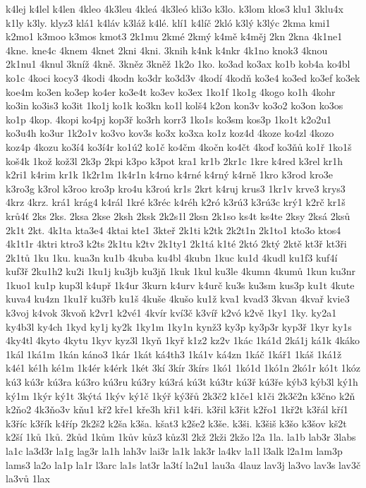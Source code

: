 k4lej
k4lel
k4len
4kleo
4k3leu
4kleá
4k3leó
kli3o
k3lo.
k3lom
klos3
klu1
3klu4x
k1ly
k3ly.
klyz3
klá1
k4láv
k3láž
k4lé.
klí1
k4líč
2kló
k3lý
k3lýc
2kma
kmi1
k2mo1
k3moo
k3mos
kmot3
2k1mu
2kmé
2kmý
k4mě
k4měj
2kn
2kna
4k1ne1
4kne.
kne4c
4knem
4knet
2kni
4kni.
3knih
k4nk
k4nkr
4k1no
knok3
4knou
2k1nu1
4knul
3kníž
4kně.
3kněz
3kněž
1k2o
1ko.
ko3ad
ko3ax
ko1b
kob4a
ko4bl
ko1c
4koci
kocy3
4kodi
4kodn
ko3dr
ko3d3v
4kodí
4kodň
ko3e4
ko3ed
ko3ef
ko3ek
koe4m
ko3en
ko3ep
ko4er
ko3e4t
ko3ev
ko3ex
1ko1f
1ko1g
4kogo
ko1h
4kohr
ko3in
ko3is3
ko3it
1ko1j
ko1k
ko3kn
ko1l
kolš4
k2on
kon3v
ko3o2
ko3on
ko3os
ko1p
4kop.
4kopi
ko4pj
kop3ř
ko3rh
korr3
1ko1s
ko3sm
kos3p
1ko1t
k2o2u1
ko3u4h
ko3ur
1k2o1v
ko3vo
kov3s
ko3x
ko3xa
ko1z
koz4d
4koze
ko4zl
4kozo
koz4p
4kozu
ko3í4
ko3í4r
ko1ú2
ko1č
ko4čm
4kočn
ko4čt
4koď
ko3ňů
ko1ř
1ko1š
koš4k
1kož
kož3l
2k3p
2kpi
k3po
k3pot
kra1
kr1b
2kr1c
1kre
k4red
k3rel
kr1h
k2ri1
k4rim
kr1k
1k2r1m
1k4r1n
k4rno
k4rné
k4rný
k4rně
1kro
k3rod
kro3e
k3ro3g
k3rol
k3roo
kro3p
kro4u
k3roú
kr1s
2krt
k4ruj
krus3
1kr1v
krve3
krys3
4krz
4krz.
krá1
krág4
k4rál
1kré
k3réc
k4réh
k2ró
k3rú3
k3rú3c
krý1
k2rč
kr1š
krů4ť
2ks
2ks.
2ksa
2kse
2ksh
2ksk
2k2s1l
2ksn
2k1so
ks4t
ks4te
2ksy
2ksá
2ksů
2k1t
2kt.
4k1ta
kta3e4
4ktai
kte1
3kteř
2k1ti
k2tk
2k2t1n
2k1to1
kto3o
ktos4
4k1t1r
4ktri
ktro3
k2ts
2k1tu
k2tv
2k1ty1
2k1tá
k1té
2któ
2ktý
2ktě
kt3ř
kt3ři
2k1tů
1ku
1ku.
kua3n
ku1b
4kuba
ku4bl
4kubn
1kuc
ku1d
4kudl
ku1f3
kuf4í
kuf3ř
2ku1h2
ku2i
1ku1j
ku3jb
ku3jň
1kuk
1kul
ku3le
4kumn
4kumů
1kun
ku3nr
1kuo1
ku1p
kup3l
k4upř
1k4ur
3kurn
k4urv
k4urč
ku3s
ku3sm
kus3p
ku1t
4kute
kuva4
ku4zn
1ku1ř
ku3řb
ku1š
4kuše
4kušo
ku1ž
kva1
kvad3
3kvan
4kvař
kvie3
k3voj
k4vok
3kvoň
k2vr1
k2vé1
4kvír
kví3č
k3víř
k2vó
k2vě
1ky1
1ky.
ky2a1
ky4b3l
ky4ch
1kyd
ky1j
ky2k
1ky1m
1ky1n
kynž3
ky3p
ky3p3r
kyp3ř
1kyr
ky1s
4ky4tl
4kyto
4kytu
1kyv
kyz3l
1kyň
1kyř
k1z2
kz2v
1kác
1ká1d
2ká1j
ká1k
4káko
1kál
1ká1m
1kán
káno3
1kár
1kát
ká4th3
1ká1v
ká4zn
1káč
1kář1
1káš
1ká1ž
k4é1
ké1h
ké1m
1k4ér
k4érk
1két
3kí
3kír
3kírs
1kó1
1kó1d
1kó1n
2kó1r
kó1t
1kóz
kú3
kú3r
kú3ra
kú3ro
kú3ru
kú3ry
kú3rá
kú3t
kú3tr
kú3ř
kú3ře
kýb3
kýb3l
ký1h
ký1m
1kýr
ký1t
3kýtá
1kýv
ký1č
1kýř
ký3řů
2k3č2
k1če1
k1či
2k3č2n
k3čno
k2ň
k2ňo2
4k3ňo3v
kňu1
kř2
kře1
kře3h
kři1
k4ři.
k3řil
k3řit
k2řo1
1kř2t
k3řál
kří1
k3říc
k3řík
k4říp
2k2š2
k2ša
k3ša.
kšat3
k2še2
k3še.
k3ši.
k3šiš
k3šo
k3šov
kš2t
k2ší
1ků
1ků.
2kůd
1kům
1kův
kůz3
kůz3l
2kž
2kži
2kžo
l2a
1la.
la1b
lab3r
3labs
la1c
la3d3r
la1g
lag3r
la1h
lah3v
lai3r
la1k
lak3r
la4kv
la1l
l3alk
l2a1m
lam3p
lams3
la2o
la1p
la1r
l3arc
la1s
lat3r
la3tí
la2u1
lau3a
4lauz
lav3j
la3vo
lav3s
lav3č
la3vů
1lax

